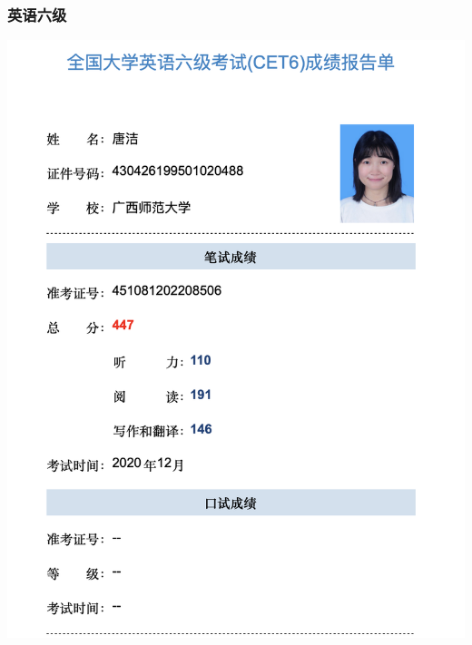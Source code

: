 \documentclass[UFT8]{ctexart}%
\begin{document}
\subsubsection{英语六级}
\includegraphics[scale=0.3]{figs/英语六级.jpg }
%

\end{document}
